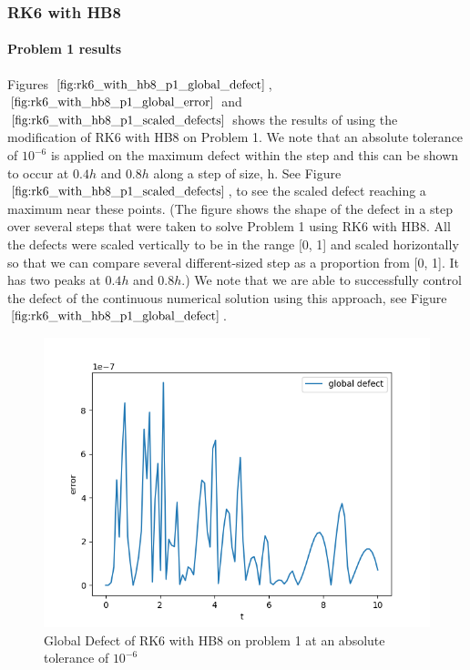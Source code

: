 \documentclass{article}
\begin{document}
\subsubsection{RK6 with HB8}
\paragraph{Problem 1 results}
Figures $\ref{fig:rk6_with_hb8_p1_global_defect}$, $\ref{fig:rk6_with_hb8_p1_global_error}$ and $\ref{fig:rk6_with_hb8_p1_scaled_defects}$ shows the results of using the modification of RK6 with HB8 on Problem 1. We note that an absolute tolerance of $10^{-6}$ is applied on the maximum defect within the step and this can be shown to occur at $0.4h$ and $0.8h$ along a step of size, h. See Figure $\ref{fig:rk6_with_hb8_p1_scaled_defects}$, to see the scaled defect reaching a maximum near these points. (The figure shows the shape of the defect in a step over several steps that were taken to solve Problem 1 using RK6 with HB8. All the defects were scaled vertically to be in the range [0, 1] and scaled horizontally so that we can compare several different-sized step as a proportion from [0, 1]. It has two peaks at $0.4h$ and $0.8h$.) We note that we are able to successfully control the defect of the continuous numerical solution using this approach, see Figure $\ref{fig:rk6_with_hb8_p1_global_defect}$. 


\begin{figure}[H]
\centering
\includegraphics[width=0.7\linewidth]{./figures/rk6_with_hb8_p1_global_defect}
\caption{Global Defect of RK6 with HB8 on problem 1 at an absolute tolerance of $10^{-6}$}
\label{fig:rk6_with_hb8_p1_global_defect}
\end{figure}
\end{document}

